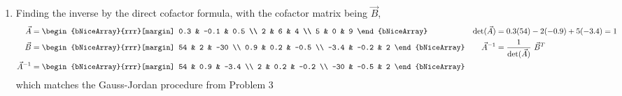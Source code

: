 \begin{enumerate}
    \item Finding the inverse by the direct cofactor formula, with the cofactor matrix
          being $ \vec{B} $,
          \begin{align}
              \vec{A}       & = \begin{bNiceArray}{rrr}[margin]
                                    0.3 & -0.1 & 0.5 \\
                                    2   & 6    & 4   \\
                                    5   & 0    & 9
                                \end{bNiceArray}      &
              \det(\vec{A}) & = 0.3(54) - 2(-0.9) + 5(-3.4) = 1      \\
              \vec{B}       & = \begin{bNiceArray}{rrr}[margin]
                                    54   & 2    & -30  \\
                                    0.9  & 0.2  & -0.5 \\
                                    -3.4 & -0.2 & 2
                                \end{bNiceArray}      &
              \vec{A}^{-1}  & = \frac{1}{\det(\vec{A})}\ \vec{B}^{T} \\
              \vec{A}^{-1}  & = \begin{bNiceArray}{rrr}[margin]
                                    54  & 0.9  & -3.4 \\
                                    2   & 0.2  & -0.2 \\
                                    -30 & -0.5 & 2
                                \end{bNiceArray}
          \end{align}
          which matches the Gauss-Jordan procedure from Problem 3


\end{enumerate}

